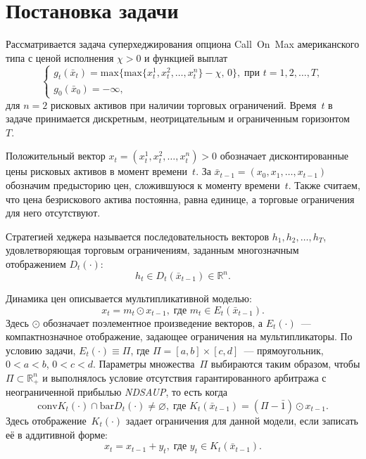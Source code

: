 \documentclass[a4paper, 12pt]{article}
\theoremstyle{def}
\theoremstyle{th}
\theoremstyle{rem}
\begin{document}
    
    \tableofcontents
    \newpage

    \section{Постановка задачи}
    Рассматривается задача суперхеджирования опциона Call~On~Max американского типа с ценой исполнения $\chi > 0$ и функцией выплат
    \begin{equation}
        \begin{cases}
        g_t(\bar x_t) = \mathrm{max}\{\mathrm{max}\{x^1_t,x^2_t,\ldots,x^n_t\} - \chi,\,0\},\;\mbox{при $t=1,2,\ldots,T,$}\\
        g_0(\bar x_0) = -\infty,
        \end{cases}
    \end{equation}
    для $n = 2$ рисковых активов при наличии торговых ограничений. Время~$t$ в задаче принимается дискретным, неотрицательным и ограниченным горизонтом~$T$.

    Положительный вектор $x_t=(x^1_t,x^2_t,\ldots,x^n_t) > 0$ обозначает дисконтированные цены рисковых активов в момент времени~$t$. За $\bar x_{t-1} = (x_0,x_1,\ldots,x_{t-1})$ обозначим предысторию цен, сложившуюся к моменту времени~$t$. Также считаем, что цена безрискового актива постоянна, равна единице, а торговые ограничения для него отсутствуют.

    Стратегией хеджера называется последовательность векторов $h_1,h_2, \ldots, h_T$, удовлетворяющая торговым ограничениям, заданным многозначным отображением $D_t(\cdot)$:
    \begin{equation}
        h_t \in D_t(\bar x_{t-1}) \in \mathbb{R}^n.
    \end{equation}

    Динамика цен описывается мультипликативной моделью:
    \begin{equation}
        x_t = m_t \odot x_{t-1},\;\mbox{где $m_t \in E_t(\bar x_{t-1})$.}
    \end{equation}
    Здесь $\odot$ обозначает поэлементное произведение векторов, а $E_t(\cdot)$~--- компактнозначное отображение, задающее ограничения на мультипликаторы. По условию задачи, $E_t(\cdot) \equiv \Pi$, где $\Pi = [a,b]\times[c,d]$~--- прямоугольник, $0<a<b$, $0<c<d$. Параметры множества~$\Pi$ выбираются таким образом, чтобы $\Pi \subset \mathbb{R}^n_+$ и выполнялось условие отсутствия гарантированного арбитража с неограниченной прибылью \textit{NDSAUP}, то есть когда
    \begin{equation}\label{eq:no_arbitrage}
        \mathrm{conv}K_t(\cdot) \cap \mathrm{bar}D_t(\cdot) \neq \varnothing,\;\mbox{где $K_t(\bar x_{t-1}) = (\Pi - \bar 1) \odot x_{t-1}$}.
    \end{equation}
    Здесь отображение~$K_t(\cdot)$ задает ограничения для данной модели, если записать её в аддитивной форме:
    \begin{equation}
        x_t = x_{t-1} + y_t,\;\mbox{где $y_t \in K_t(\bar x_{t-1})$.}
    \end{equation}
\end{document}
